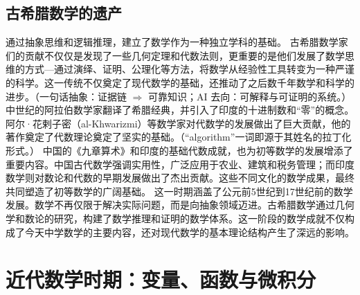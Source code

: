 \subsection{古希腊数学的遗产}


通过抽象思维和逻辑推理，建立了数学作为一种独立学科的基础。
古希腊数学家们的贡献不仅仅是发现了一些几何定理和代数法则，更重要的是他们发展了数学思维的方式---通过演绎、证明、公理化等方法，将数学从经验性工具转变为一种严谨的科学。这一传统不仅奠定了现代数学的基础，还推动了之后数千年数学和科学的进步。{（一句话抽象：证据链 $\Rightarrow$ 可靠知识；AI 去向：可解释与可证明的系统。）}
中世纪的阿拉伯数学家翻译了希腊经典，并引入了印度的十进制数和“零”的概念。阿尔·花剌子密（al-Khwarizmi）等数学家对代数学的发展做出了巨大贡献，他的著作奠定了代数理论奠定了坚实的基础。{（“algorithm”一词即源于其姓名的拉丁化形式。）}
中国的《九章算术》和印度的基础代数成就，也为初等数学的发展增添了重要内容。中国古代数学强调实用性，广泛应用于农业、建筑和税务管理；而印度数学则对数论和代数的早期发展做出了杰出贡献。这些不同文化的数学成果，最终共同塑造了初等数学的广阔基础。
这一时期涵盖了公元前5世纪到17世纪前的数学发展。数学不再仅限于解决实际问题，而是向抽象领域迈进。古希腊数学通过几何学和数论的研究，构建了数学推理和证明的数学体系。这一阶段的数学成就不仅构成了今天中学数学的主要内容，还对现代数学的基本理论结构产生了深远的影响。

\section{近代数学时期：变量、函数与微积分}


